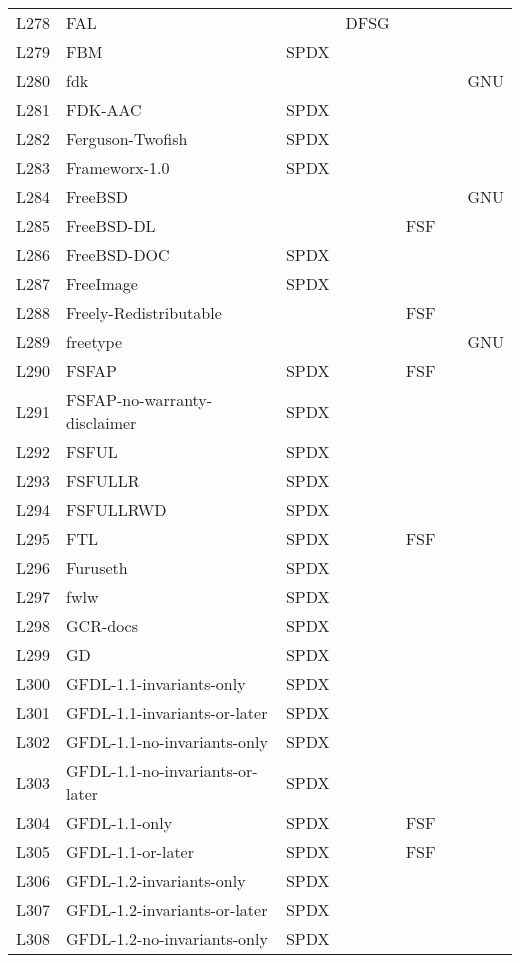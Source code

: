 \begin{longtable}[h]{m{2cm} | m{7cm} | c | c | c | c | c}
  L278 & FAL &  & DFSG &  &  &  \\
  L279 & FBM & SPDX &  &  &  &  \\
  L280 & fdk &  &  &  &  & GNU \\
  L281 & FDK-AAC & SPDX &  &  &  &  \\
  L282 & Ferguson-Twofish & SPDX &  &  &  &  \\
  L283 & Frameworx-1.0 & SPDX &  &  &  &  \\
  L284 & FreeBSD &  &  &  &  & GNU \\
  L285 & FreeBSD-DL &  &  & FSF &  &  \\
  L286 & FreeBSD-DOC & SPDX &  &  &  &  \\
  L287 & FreeImage & SPDX &  &  &  &  \\
  L288 & Freely-Redistributable &  &  & FSF &  &  \\
  L289 & freetype &  &  &  &  & GNU \\
  L290 & FSFAP & SPDX &  & FSF &  &  \\
  L291 & FSFAP-no-warranty-disclaimer & SPDX &  &  &  &  \\
  L292 & FSFUL & SPDX &  &  &  &  \\
  L293 & FSFULLR & SPDX &  &  &  &  \\
  L294 & FSFULLRWD & SPDX &  &  &  &  \\
  L295 & FTL & SPDX &  & FSF &  &  \\
  L296 & Furuseth & SPDX &  &  &  &  \\
  L297 & fwlw & SPDX &  &  &  &  \\
  L298 & GCR-docs & SPDX &  &  &  &  \\
  L299 & GD & SPDX &  &  &  &  \\
  L300 & GFDL-1.1-invariants-only & SPDX &  &  &  &  \\
  L301 & GFDL-1.1-invariants-or-later & SPDX &  &  &  &  \\
  L302 & GFDL-1.1-no-invariants-only & SPDX &  &  &  &  \\
  L303 & GFDL-1.1-no-invariants-or-later & SPDX &  &  &  &  \\
  L304 & GFDL-1.1-only & SPDX &  & FSF &  &  \\
  L305 & GFDL-1.1-or-later & SPDX &  & FSF &  &  \\
  L306 & GFDL-1.2-invariants-only & SPDX &  &  &  &  \\
  L307 & GFDL-1.2-invariants-or-later & SPDX &  &  &  &  \\
  L308 & GFDL-1.2-no-invariants-only & SPDX &  &  &  &  \\

\end{longtable}
